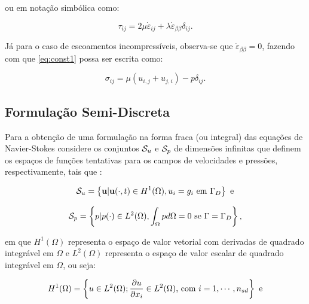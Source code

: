 \documentclass[_ArquivoPrincipal.tex]{subfiles}
\begin{document}
\noindent ou em notação simbólica como:

\begin{equation}
    \tau_{ij}=2\mu\dot{\varepsilon}_{ij}+\lambda\dot{\varepsilon}_{\beta\beta}\delta_{ij}\text{.}
\end{equation}

Já para o caso de escoamentos incompressíveis, observa-se que $\dot{\varepsilon}_{\beta\beta}=0$, fazendo com que \ref{eq:const1} possa ser escrita como:

\begin{equation}
    \sigma_{ij}=\mu(u_{i,j}+u_{j,i})-p\delta_{ij}\text{.}\label{eq:ModConst}
\end{equation}

\subsection{Formulação Semi-Discreta} \label{FSD}

Para a obtenção de uma formulação na forma fraca (ou integral) das equações de Navier-Stokes considere os conjuntos $\mathcal{S}_u$ e $\mathcal{S}_p$ de dimensões infinitas que definem os espaços de funções tentativas para os campos de velocidades e pressões, respectivamente, tais que \cite{bazilevs2013computational,fernandes2020tecnica}:

\begin{equation}
    \mathcal{S}_u=\left\{\mathbf{u}|\mathbf{u}(\cdot,t)\in H^1(\Omega),u_i=g_i\text{ em }\Gamma_D\right\}\text{ e}
\end{equation}

\begin{equation}
    \mathcal{S}_p=\left\{p|p(\cdot)\in L^2(\Omega),\int_\Omega{pd\Omega}=0\text{ se }\Gamma=\Gamma_D\right\}\text{,}
\end{equation}

\noindent em que $H^1(\Omega)$ representa o espaço de valor vetorial com derivadas de quadrado integrável em $\Omega$ e $L^2(\Omega)$ representa o espaço de valor escalar de quadrado integrável em $\Omega$, ou seja:

\begin{equation}
    H^1(\Omega)=\left\{u\in L^2(\Omega);\frac{\partial{u}}{\partial{x_i}}\in L^2(\Omega)\text{, com }i=1,\cdots,n_{sd}\right\}\text{ e}
\end{equation}
\end{document}
